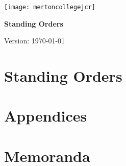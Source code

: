 \documentclass[11pt,a4paper,oneside]{memoir}
\begin{document}
	\pagestyle{plain}
	\thispagestyle{empty}
	\begin{center}
		\texttt{[image: mertoncollegejcr]}
		\begin{vplace}[0.1] \Huge  
			\textbf{Standing Orders}
		\end{vplace}
		{ \Large
			Version: \today
		}
		\vfill
	\end{center}
	\cleardoublepage
	\frontmatter
	\tableofcontents
	
	
	\mainmatter
	\part{Standing Orders}
	
	
	
	
	
	
	
	
	
	
	
	\part{Appendices}
	\begin{appendices}
		
        
		
		
		
		
	\end{appendices}
	\part{Memoranda}
	\begin{appendices}
		
		
		
	\end{appendices}
		
	
	
\end{document}
